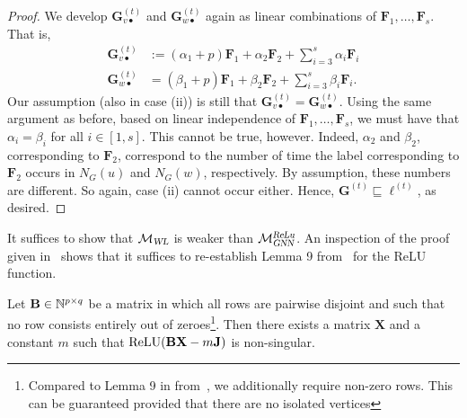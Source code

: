 \begin{proof}
We develop $\mathbf{G}^{(t)}_{v\bullet}$ and $\mathbf{G}^{(t)}_{w\bullet}$ again as linear combinations of $\mathbf{F}_1,\ldots,\mathbf{F}_s$. That is,
	\begin{align*}
	\mathbf{G}^{(t)}_{v\bullet}&:=(\alpha_1+p)\mathbf{F}_1+ \alpha_2\mathbf{F}_2+ \sum_{i=3}^s \alpha_i\mathbf{F}_i\\
	\mathbf{G}^{(t)}_{w\bullet}&=(\beta_1+p)\mathbf{F}_1+ \beta_2\mathbf{F}_2+ \sum_{i=3}^s \beta_i\mathbf{F}_i.
	\end{align*}
	Our assumption (also in case (ii)) is still that $\mathbf{G}^{(t)}_{v\bullet}=\mathbf{G}^{(t)}_{w\bullet}$. Using the same argument as before, based on linear independence of $\mathbf{F}_1,\ldots,\mathbf{F}_s$, we must have that 
	$\alpha_i=\beta_i$ for all $i\in [1,s]$.
This cannot be true, however. Indeed,
 $\alpha_2$ and $\beta_2$, corresponding to $\mathbf{F}_2$, correspond to the number of time the label corresponding to $\mathbf{F}_2$ occurs in $N_G(u)$ and $N_G(w)$, respectively. By assumption, these numbers are different. So again, case (ii) cannot occur either. Hence, $\mathbf{G}^{(t)}\sqsubseteq \pmb{\ell}^{(t)}$, as desired.



	
\end{proof}
It suffices to show that  $\mathcal{M}_{\textsl{WL}}$
is weaker than $\mathcal{M}_{\textsl{GNN}}^{\textsl{ReLu}}$.
An inspection of the proof given in~\cite{grohewl} shows that it suffices to re-establish Lemma 9 from~\cite{grohewl} for the ReLU function. \begin{lemma}\label{lem:relulemma9}
  Let
  $\mathbf{B}\in \mathbb{N}^{p\times q}$ be a matrix in which all
  rows are pairwise disjoint and such that no row consists entirely
  out of zeroes\footnote{Compared to Lemma 9 in from~\cite{grohewl},
 we additionally require non-zero rows. This can be guaranteed provided that there are no isolated vertices}.
  Then there exists a matrix $\mathbf{X}$ and a constant $m$
  such that $\text{\normalfont ReLU}(\mathbf{BX}-m\mathbf{J})$ is
  non-singular.
\end{lemma}
